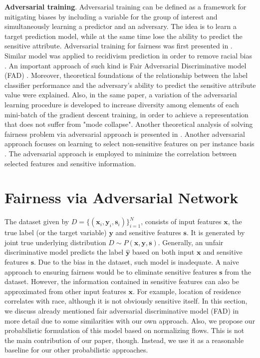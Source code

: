 \documentclass[preprint,12pt]{elsarticle}
\begin{document}
\textbf{Adversarial training}. Adversarial training can be defined as a framework for mitigating biases by including a variable for the group of interest and simultaneously learning a predictor and an adversary. The idea is to learn a target prediction model, while at the same time lose the ability to predict the sensitive attribute. 
Adversarial training for fairness was first presented in \cite{zhang2018mitigating}. Similar model was applied to recidivism prediction in order to remove racial bias \cite{wadsworth2018achieving}.
An important approach of such kind is Fair Adversarial Discriminative model (FAD) \cite{adel2019one}. Moreover, theoretical foundations of the relationship between the label classifier performance and the adversary’s ability to predict the sensitive attribute value were explained. Also, in the same paper, a variation of the adversarial learning procedure is developed to increase diversity among elements of each mini-batch of the gradient descent training, in order to achieve a representation that does not suffer from "mode collapse".
Another theoretical analysis of solving fairness problem via adversarial approach is presented in \cite{madras2018learning}.
Another adversarial approach focuses on learning to select non-sensitive features on per instance basis \cite{wang2019approaching}. The adversarial approach is employed to minimize the correlation between selected features and sensitive information. 



\section{Fairness via Adversarial Network}
\label{Sec:advnet}
The dataset given by $D= \{(\mathbf{x}_i, \mathbf{y}_i, \mathbf{s}_i) \}_{i=1}^N$, consists of input features $\mathbf{x}$, the true label (or the target variable) $\mathbf{y}$ and sensitive features $\mathbf{s}$. It is generated by joint true underlying distribution $D \sim P(\mathbf{x},\mathbf{y},\mathbf{s})$. Generally, an unfair discriminative model predicts the label $\mathbf{\hat{y}}$ based on both input $\mathbf{x}$ and sensitive  features $\mathbf{s}$. Due to the bias in the dataset, such model is inadequate. A naive approach to ensuring fairness would be to eliminate sensitive features $\mathbf{s}$ from the dataset. However, the information contained in sensitive features can also be approximated from other input features $\mathbf{x}$. For example, location of residence correlates with race, although it is not obviously sensitive itself. In this section, we discuss already mentioned fair adversarial discriminative model (FAD) in more detail due to some similarities with our own approach. Also, we propose our probabilistic formulation of this model based on normalizing flows. This is not the main contribution of our paper, though. Instead, we use it as a reasonable baseline for our other probabilistic approaches.
\end{document}
